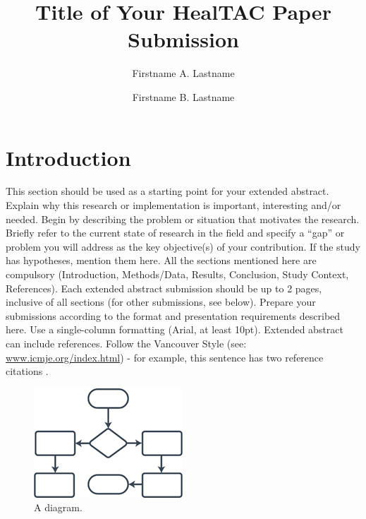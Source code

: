 \documentclass[11pt]{article}
\title{Title of Your HealTAC Paper Submission}
\begin{document}
\renewcommand\Authand{}

\author[1]{Firstname A. Lastname}
\author[2]{ Firstname B. Lastname}

 
\date{}
\maketitle

\renewcommand{\absnamepos}{flushleft}
\setlength{\absleftindent}{0pt}
\setlength{\absrightindent}{0pt}

\section*{Introduction}
This section should be used as a starting point for your extended abstract. Explain why this research or implementation is important, interesting and/or needed. Begin by describing the problem or situation that motivates the research. Briefly refer to the current state of research in the field and specify a “gap” or problem you will address as the key objective(s) of your contribution. If the study has hypotheses, mention them here.
All the sections mentioned here are compulsory (Introduction, Methods/Data, Results, Conclusion, Study Context, References). Each extended abstract submission should be up to 2 pages, inclusive of all sections (for other submissions, see below). Prepare your submissions according to the format and presentation requirements described here. Use a single-column formatting (Arial, at least 10pt). Extended abstract can include references. Follow the Vancouver Style (see: \href{https://www.icmje.org/index.html}{www.icmje.org/index.html}) - for example, this sentence has two reference citations \citep{ta1983gardner,gardner1990computer}.


\begin{figure}[h]
\centering
\includegraphics[width=0.5\linewidth]{template-image.png}
\caption{A diagram.}
\label{template-image}
\end{figure}
\end{document}
